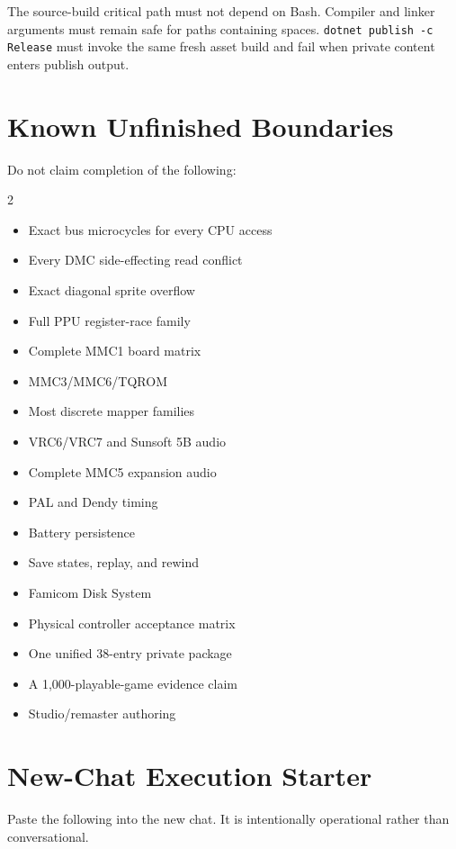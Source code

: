 \documentclass[10pt,letterpaper]{article}
\newcommand{\code}[1]{\texttt{\small #1}}
\begin{document}
The source-build critical path must not depend on Bash. Compiler and linker arguments must remain safe for paths containing spaces. \code{dotnet publish -c Release} must invoke the same fresh asset build and fail when private content enters publish output.

\section{Known Unfinished Boundaries}

Do not claim completion of the following:
\begin{multicols}{2}
\begin{itemize}
\item Exact bus microcycles for every CPU access
\item Every DMC side-effecting read conflict
\item Exact diagonal sprite overflow
\item Full PPU register-race family
\item Complete MMC1 board matrix
\item MMC3/MMC6/TQROM
\item Most discrete mapper families
\item VRC6/VRC7 and Sunsoft 5B audio
\item Complete MMC5 expansion audio
\item PAL and Dendy timing
\item Battery persistence
\item Save states, replay, and rewind
\item Famicom Disk System
\item Physical controller acceptance matrix
\item One unified 38-entry private package
\item A 1,000-playable-game evidence claim
\item Studio/remaster authoring
\end{itemize}
\end{multicols}

\section{New-Chat Execution Starter}

Paste the following into the new chat. It is intentionally operational rather than conversational.
\end{document}
